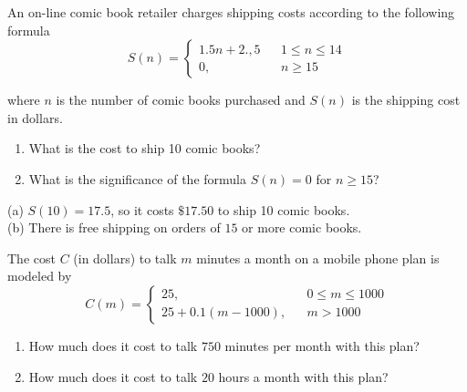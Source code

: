 \begin{enumialphparenastyle}
\begin{multicols}{2}
\begin{ex}
An on-line comic book retailer charges shipping costs according to the following formula \[{\displaystyle S(n) = \left\{ \begin{array}{rcl}  1.5 n + 2.,5 &  & 1 \leq n \leq 14  \\
	0,  & & n \geq 15
	\end{array} \right. }\]

where $n$ is the number of  comic books purchased and $S(n)$ is the shipping cost in dollars.

\begin{enumerate}
	
	\item  What is the cost to ship 10 comic books?  %
	
	\item  What is the significance of the formula $S(n) = 0$ for $n \geq 15$?   %
\end{enumerate} 		
		
\begin{sol}
(a) \hspace{2mm} $S(10) = 17.5$, so it costs $\$ 17.50$ to ship 10 comic books. \\
(b) \hspace{2mm} There is free shipping on orders of $15$ or more comic books. \\
			
\end{sol}	
\end{ex}
	
	
\begin{ex}
The cost $C$ (in dollars) to talk $m$ minutes a month on a mobile phone plan is modeled by   \[{\displaystyle C(m) = \left\{ \begin{array}{rcl} 25, & & 0 \leq m \leq 1000 \\
	25+0.1(m-1000), &  & m > 1000
	\end{array} \right. }\]

\begin{enumerate}
	
	\item  How much does it cost to talk $750$ minutes per month with this plan?  %
	
	\item  How much does it cost to talk $20$ hours a month with this plan?  %
	

\end{enumerate}
\end{ex}
\end{multicols}
\end{enumialphparenastyle}
